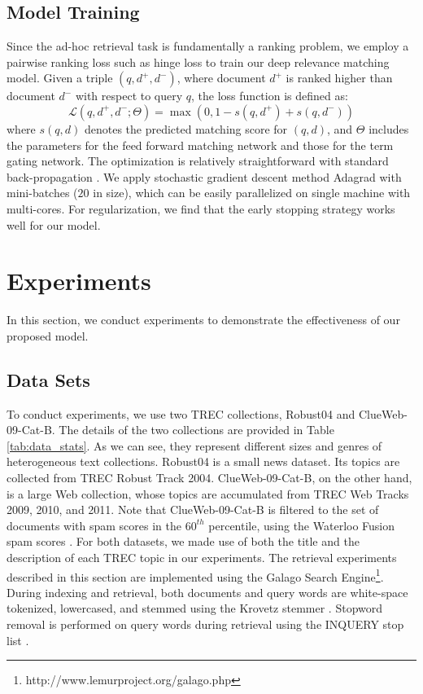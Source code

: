 \documentclass{sig-alternate-05-2015}
\begin{document}
\subsection{Model Training}
Since the ad-hoc retrieval task is fundamentally a ranking problem, we employ a pairwise ranking loss such as hinge loss to train our deep relevance matching model. Given a triple $(q,d^+,d^-)$, where document $d^+$ is ranked higher than document $d^-$ with respect to query $q$, the loss function is defined as:
\begin{equation*}
\mathcal{L}(q,d^+,d^-;\Theta) = \max(0, 1-s(q, d^+)+s(q, d^-))
\end{equation*}
where $s(q,d)$ denotes the predicted matching score for $(q,d)$, and $\Theta$ includes the parameters for the feed forward matching network and those for the term gating network. The optimization is relatively straightforward with standard back-propagation \cite{williams1986learning}. We apply stochastic gradient descent method Adagrad \cite{duchi2011adaptive} with mini-batches ($20$ in size), which can be easily parallelized on single machine with multi-cores. For regularization, we find that the early stopping \cite{giles2001overfitting} strategy works well for our model. 
\section{Experiments}
In this section, we conduct experiments to demonstrate the effectiveness of our proposed model. 

\subsection{Data Sets}
To conduct experiments, we use two TREC collections, Robust04 and ClueWeb-09-Cat-B.
The details of the two collections are provided in Table \ref{tab:data_stats}. As we can see, they represent different sizes and genres of heterogeneous text collections. Robust04 is a small news dataset. Its topics are collected from TREC Robust Track 2004. ClueWeb-09-Cat-B, on the other hand, is a large Web collection, whose topics are accumulated from TREC Web Tracks 2009, 2010, and 2011. Note that ClueWeb-09-Cat-B is filtered to the set of documents with spam scores in the $60^{th}$ percentile, using the Waterloo Fusion spam scores \cite{cormack2011efficient}. For both datasets, we made use of both the title and the description of each TREC topic in our experiments. The retrieval experiments described in this section are implemented using the Galago Search Engine\footnote{http://www.lemurproject.org/galago.php}. During indexing and retrieval, both documents and query words are white-space tokenized, lowercased, and stemmed using the Krovetz stemmer \cite{krovetz1993viewing}. Stopword removal is performed on query words during retrieval using the INQUERY stop list \cite{callan1995trec}.
\end{document}
